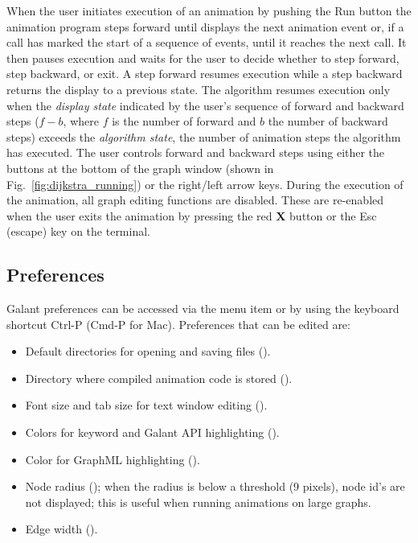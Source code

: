 When the user initiates execution of an animation by pushing the \textsf{Run}
button
the animation program
steps forward until
displays the next animation event or, if a 
call has marked the start of a sequence of events, until
it reaches the next  call.
It then pauses execution and waits for the user to decide whether to
step forward, step backward, or exit.
A step forward resumes execution while a step backward returns the display to a previous
state.
The algorithm resumes execution only when the \emph{display state}
indicated by the user's sequence of forward and backward steps
($f-b$, where $f$ is the number of forward and $b$ the number of backward steps)
exceeds the \emph{algorithm state}, the number of animation steps the algorithm
has executed.
The user controls forward and backward steps using either the buttons at the
bottom of the graph window (shown in Fig.~\ref{fig:dijkstra_running})
or the right/left arrow keys.
During the execution of the animation, all graph editing functions are disabled.
These are re-enabled when the user exits the animation by pressing the red \textbf{X} button or the \textsf{Esc} (escape) key on the terminal.

\subsection{Preferences}
\label{sec:preferences}

Galant preferences can be accessed via the 
menu item or by using the keyboard shortcut \textsf{Ctrl-P}
(\textsf{Cmd-P} for Mac).
Preferences that can be edited are:
\begin{itemize}
\item
Default directories for opening and saving files ().
\item
Directory where compiled animation code is stored ().
\item
Font size and tab size for text window editing ().
\item
Colors for keyword and Galant API highlighting ().
\item
Color for GraphML highlighting ().
\item
Node radius ();
when the radius is below a threshold (9 pixels), node id's are not displayed;
this is useful when running animations on large graphs.
\item
Edge width ().
\end{itemize}


